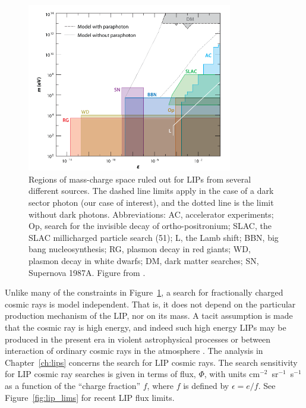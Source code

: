 \begin{figure}[htbp]
\begin{center}
\includegraphics[width=0.8\textwidth]{figures/theory/lip_constraints.png}
\caption{Regions of mass-charge space ruled out for \ac{LIP}s from several different sources. The dashed line limits apply in the case of a dark sector photon (our case of interest), and the dotted line is the limit without dark photons. Abbreviations: AC, accelerator experiments; Op, search for the invisible decay of ortho-positronium; SLAC, the SLAC millicharged particle search (51); L, the Lamb shift; BBN, big bang nucleosynthesis; RG, plasmon decay in red giants; WD, plasmon decay in white dwarfs; DM, dark matter searches; SN, Supernova 1987A.  Figure from \cite{Perl2009}. }
\label{fig:lip_constraints}
\end{center}
\end{figure}

Unlike many of the constraints in Figure~\ref{fig:lip_constraints}, a search for fractionally charged cosmic rays is model independent. That is, it does not depend on the particular production mechanism of the \ac{LIP}, nor on its mass. A tacit assumption is made that the cosmic ray is high energy, and indeed such high energy \ac{LIP}s may be produced in the present era in violent astrophysical processes or between interaction of ordinary cosmic rays in the atmosphere \cite{Perl2009}. The analysis in Chapter~\ref{ch:lips} concerns the search for \ac{LIP} cosmic rays. The search sensitivity for \ac{LIP} cosmic ray searches is given in terms of flux, $\Phi$, with units cm$^{-2}$~sr$^{-1}$~s$^{-1}$ as a function of the ``charge fraction'' $f$, where $f$ is defined by $\epsilon = e/f$. See Figure~\ref{fig:lip_lims} for recent \ac{LIP} flux limits. 

